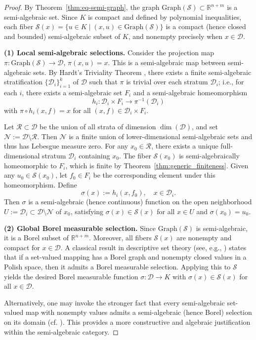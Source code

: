\documentclass[sn-basic,Numbered]{sn-jnl}
\theoremstyle{thmstyleone}%
\begin{document}
\begin{proof}
By Theorem~\ref{thm:eq-semi-graph}, the graph $\mathrm{Graph}(\mathcal{S}) \subset \mathbb{R}^{n+m}$ is a semi-algebraic set. Since $K$ is compact and defined by polynomial inequalities, each fiber $\mathcal{S}(x) = \{u \in K \mid (x,u) \in \mathrm{Graph}(\mathcal{S})\}$ is a compact (hence closed and bounded) semi-algebraic subset of $K$, and nonempty precisely when $x \in \mathcal{D}$.

\smallskip
\noindent\textbf{(1) Local semi-algebraic selections.}
Consider the projection map $\pi : \mathrm{Graph}(\mathcal{S}) \to \mathcal{D}$, $\pi(x,u) = x$. This is a semi-algebraic map between semi-algebraic sets. By Hardt’s Triviality Theorem \cite{hardt1980semi}, there exists a finite semi-algebraic stratification $\{\mathcal{D}_i\}_{i=1}^k$ of $\mathcal{D}$ such that $\pi$ is trivial over each stratum $\mathcal{D}_i$; i.e., for each $i$, there exists a semi-algebraic set $F_i$ and a semi-algebraic homeomorphism
\[
h_i : \mathcal{D}_i \times F_i \to \pi^{-1}(\mathcal{D}_i)
\]
with $\pi \circ h_i(x,f) = x$ for all $(x,f) \in \mathcal{D}_i \times F_i$.

Let $\mathcal{R} \subset \mathcal{D}$ be the union of all strata of dimension $\dim(\mathcal{D})$, and set $\mathcal{N} := \mathcal{D} \setminus \mathcal{R}$. Then $\mathcal{N}$ is a finite union of lower-dimensional semi-algebraic sets and thus has Lebesgue measure zero. For any $x_0 \in \mathcal{R}$, there exists a unique full-dimensional stratum $\mathcal{D}_i$ containing $x_0$. The fiber $\mathcal{S}(x_0)$ is semi-algebraically homeomorphic to $F_i$, which is finite by Theorem~\ref{thm:generic_finiteness}. Given any $u_0 \in \mathcal{S}(x_0)$, let $f_0 \in F_i$ be the corresponding element under this homeomorphism. Define
\[
\sigma(x) := h_i(x, f_0), \quad x \in \mathcal{D}_i.
\]
Then $\sigma$ is a semi-algebraic (hence continuous) function on the open neighborhood $U := \mathcal{D}_i \subset \mathcal{D} \setminus \mathcal{N}$ of $x_0$, satisfying $\sigma(x) \in \mathcal{S}(x)$ for all $x \in U$ and $\sigma(x_0) = u_0$.

\smallskip
\noindent\textbf{(2) Global Borel measurable selection.}
Since $\mathrm{Graph}(\mathcal{S})$ is semi-algebraic, it is a Borel subset of $\mathbb{R}^{n+m}$. Moreover, all fibers $\mathcal{S}(x)$ are nonempty and compact for $x \in \mathcal{D}$. A classical result in descriptive set theory (see, e.g., \cite[Theorem~5.5.2]{Srivastava1998}) states that if a set-valued mapping has a Borel graph and nonempty closed values in a Polish space, then it admits a Borel measurable selection. Applying this to $\mathcal{S}$ yields the desired Borel measurable function $\sigma: \mathcal{D} \to K$ with $\sigma(x) \in \mathcal{S}(x)$ for all $x \in \mathcal{D}$.

Alternatively, one may invoke the stronger fact that every semi-algebraic set-valued map with nonempty values admits a semi-algebraic (hence Borel) selection on its domain (cf. \cite[Corollary~1.6]{BenedettiRisler1990}). This provides a more constructive and algebraic justification within the semi-algebraic category.
\end{proof}
\end{document}

